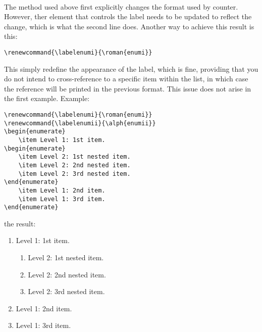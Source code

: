 {\paragraph{}
The method used above first explicitly changes the format used by counter.
However, ther element that controls the label needs to be updated to reflect
the change, which is what the second line does. Another way to achieve this
result is this:
\begin{verbatim}
\renewcommand{\labelenumi}{\roman{enumi}}
\end{verbatim}
This simply redefine the appearance of the label, which is fine, providing
that you do not intend to cross-reference to a specific item within the list,
in which case the reference will be printed in the previous format. This
issue does not arise in the first example.
Example:
\begin{verbatim}
\renewcommand{\labelenumi}{\roman{enumi}}
\renewcommand{\labelenumii}{\alph{enumii}}
\begin{enumerate}
	\item Level 1: 1st item.
\begin{enumerate}
	\item Level 2: 1st nested item.
	\item Level 2: 2nd nested item.
	\item Level 2: 3rd nested item.
\end{enumerate}
	\item Level 1: 2nd item.
	\item Level 1: 3rd item.
\end{enumerate}
\end{verbatim}
the result:
\renewcommand{\labelenumi}{\roman{enumi}}
\renewcommand{\labelenumii}{\alph{enumii}}
\begin{enumerate}
	\item Level 1: 1st item.
\begin{enumerate}
	\item Level 2: 1st nested item.
	\item Level 2: 2nd nested item.
	\item Level 2: 3rd nested item.
\end{enumerate}
	\item Level 1: 2nd item.
	\item Level 1: 3rd item.
\end{enumerate}

}
